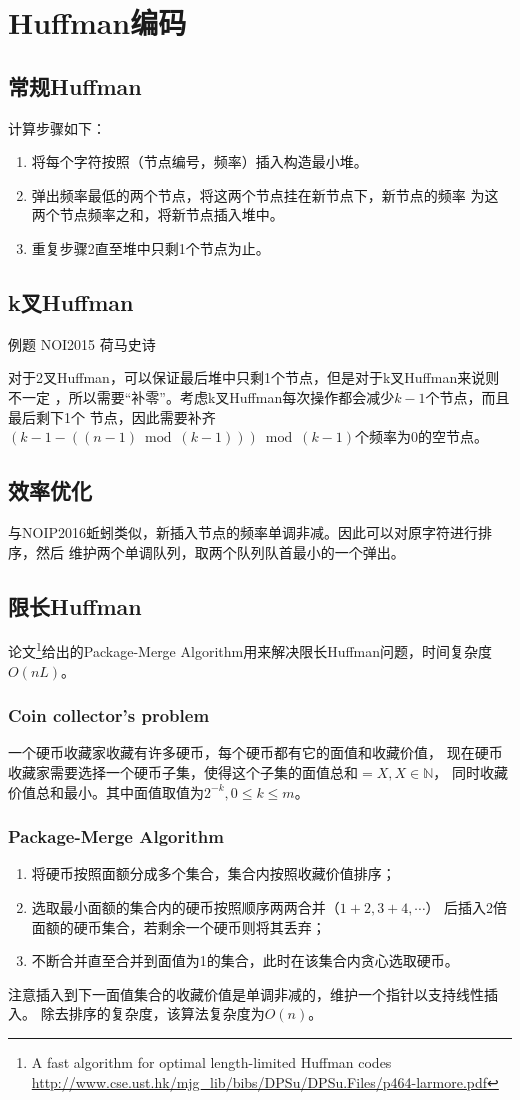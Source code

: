 \section{Huffman编码}
\subsection{常规Huffman}
计算步骤如下：
\begin{enumerate}
	\item 将每个字符按照（节点编号，频率）插入构造最小堆。
	\item 弹出频率最低的两个节点，将这两个节点挂在新节点下，新节点的频率
	      为这两个节点频率之和，将新节点插入堆中。
	\item 重复步骤2直至堆中只剩1个节点为止。
\end{enumerate}
\subsection{k叉Huffman}
例题 NOI2015 荷马史诗

对于2叉Huffman，可以保证最后堆中只剩1个节点，但是对于k叉Huffman来说则不一定
，所以需要``补零''。考虑k叉Huffman每次操作都会减少$k-1$个节点，而且最后剩下1个
节点，因此需要补齐$(k-1 - ((n-1) \bmod (k-1))) \bmod (k-1)$个频率为0的空节点。
\subsection{效率优化}
与NOIP2016蚯蚓类似，新插入节点的频率单调非减。因此可以对原字符进行排序，然后
维护两个单调队列，取两个队列队首最小的一个弹出。
\subsection{限长Huffman}
论文\footnote{A fast algorithm for optimal length-limited Huffman codes\\
	\url{http://www.cse.ust.hk/mjg\_lib/bibs/DPSu/DPSu.Files/p464-larmore.pdf}
}\cite{LLH}给出的Package-Merge Algorithm用来解决限长Huffman问题，时间复杂度$O(nL)$。
\subsubsection{Coin collector's problem}
一个硬币收藏家收藏有许多硬币，每个硬币都有它的面值和收藏价值，
现在硬币收藏家需要选择一个硬币子集，使得这个子集的面值总和$=X,X\in \mathbb{N}$，
同时收藏价值总和最小。其中面值取值为$2^{-k},0\leq k \leq m$。
\subsubsection{Package-Merge Algorithm}
\begin{enumerate}
	\item 将硬币按照面额分成多个集合，集合内按照收藏价值排序；
	\item 选取最小面额的集合内的硬币按照顺序两两合并（$1+2,3+4,\cdots$）
	      后插入2倍面额的硬币集合，若剩余一个硬币则将其丢弃；
	\item 不断合并直至合并到面值为1的集合，此时在该集合内贪心选取硬币。
\end{enumerate}
注意插入到下一面值集合的收藏价值是单调非减的，维护一个指针以支持线性插入。
除去排序的复杂度，该算法复杂度为$O(n)$。

